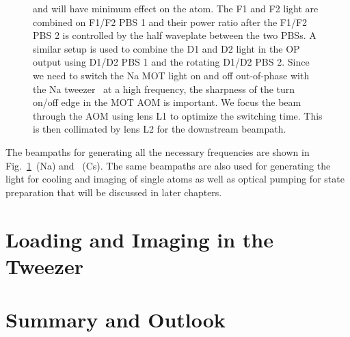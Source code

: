 \begin{figure}
{    and will have minimum effect on the atom.
    The F1 and F2 light are combined on F1/F2 PBS 1 and their power ratio after the
    F1/F2 PBS 2 is controlled by the half waveplate between the two PBSs.
    A similar setup is used to combine the D1 and D2 light in the OP output using
    D1/D2 PBS 1 and the rotating D1/D2 PBS 2.
    Since we need to switch the Na MOT light on and off out-of-phase
    with the Na tweezer~\cite{hutzler_eliminating_2017} at a high frequency,
    the sharpness of the turn on/off edge in the MOT AOM is important.
    We focus the beam through the AOM using lens L1 to optimize the switching time.
    This is then collimated by lens L2 for the downstream beampath.
    \label{fig:loading:free-space:na-res-beampath}}
\end{figure}

The beampaths for generating all the necessary frequencies are shown in
Fig.~\ref{fig:loading:free-space:na-res-beampath}~(Na) and \todo{}~(Cs).
The same beampaths are also used for generating the light for cooling
and imaging of single atoms as well as optical pumping for state preparation
that will be discussed in later chapters.

\section{Loading and Imaging in the Tweezer}
\label{ch:loading:loading}



\section{Summary and Outlook}
\label{ch:loading:summary}

\todo{}
